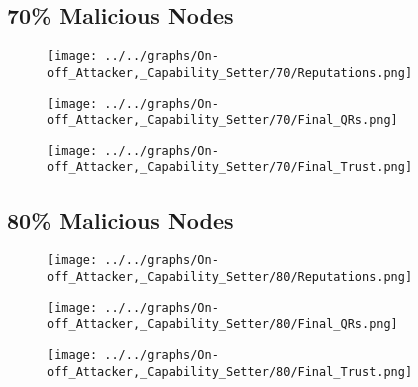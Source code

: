 \begin{minipage}[t]{0.49\columnwidth}
\subsection*{70\% Malicious Nodes}
    \begin{figure}[H]
        \centering
        \texttt{[image: ../../graphs/On-off\_Attacker,\_Capability\_Setter/70/Reputations.png]}
    \end{figure}
    \begin{figure}[H]
        \centering
        \texttt{[image: ../../graphs/On-off\_Attacker,\_Capability\_Setter/70/Final\_QRs.png]}
    \end{figure}
\end{minipage}
\begin{minipage}[t]{0.49\columnwidth}
    \begin{figure}[H]
        \centering
        \texttt{[image: ../../graphs/On-off\_Attacker,\_Capability\_Setter/70/Final\_Trust.png]}
    \end{figure}
\end{minipage}

\begin{minipage}[t]{0.49\columnwidth}
\subsection*{80\% Malicious Nodes}
    \begin{figure}[H]
        \centering
        \texttt{[image: ../../graphs/On-off\_Attacker,\_Capability\_Setter/80/Reputations.png]}
    \end{figure}
    \begin{figure}[H]
        \centering
        \texttt{[image: ../../graphs/On-off\_Attacker,\_Capability\_Setter/80/Final\_QRs.png]}
    \end{figure}
\end{minipage}
\begin{minipage}[t]{0.49\columnwidth}
    \begin{figure}[H]
        \centering
        \texttt{[image: ../../graphs/On-off\_Attacker,\_Capability\_Setter/80/Final\_Trust.png]}
    \end{figure}
\end{minipage}

